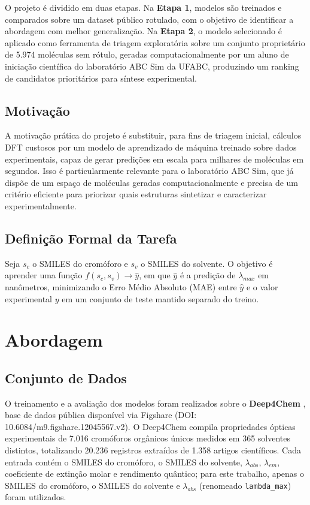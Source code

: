 \documentclass[12pt]{article}
\begin{document}
O projeto é dividido em duas etapas. Na \textbf{Etapa 1}, modelos são treinados e
comparados sobre um dataset público rotulado, com o objetivo de identificar a abordagem
com melhor generalização. Na \textbf{Etapa 2}, o modelo selecionado é aplicado como
ferramenta de triagem exploratória sobre um conjunto proprietário de 5.974 moléculas sem
rótulo, geradas computacionalmente por um aluno de iniciação científica do laboratório
ABC Sim da UFABC, produzindo um ranking de candidatos prioritários para síntese
experimental.

\subsection{Motivação}

A motivação prática do projeto é substituir, para fins de triagem inicial, cálculos DFT
custosos por um modelo de aprendizado de máquina treinado sobre dados experimentais, capaz
de gerar predições em escala para milhares de moléculas em segundos. Isso é particularmente
relevante para o laboratório ABC Sim, que já dispõe de um espaço de moléculas geradas
computacionalmente e precisa de um critério eficiente para priorizar quais estruturas
sintetizar e caracterizar experimentalmente.

\subsection{Definição Formal da Tarefa}

Seja $s_c$ o SMILES do cromóforo e $s_v$ o SMILES do solvente. O objetivo é aprender uma
função $f(s_c, s_v) \rightarrow \hat{y}$, em que $\hat{y}$ é a predição de $\lambda_{max}$
em nanômetros, minimizando o Erro Médio Absoluto (MAE) entre $\hat{y}$ e o valor
experimental $y$ em um conjunto de teste mantido separado do treino.


\section{Abordagem}
\label{sec:abordagem}

\subsection{Conjunto de Dados}

O treinamento e a avaliação dos modelos foram realizados sobre o \textbf{Deep4Chem}
\cite{joung2020}, base de dados pública disponível via Figshare (DOI:
10.6084/m9.figshare.12045567.v2). O Deep4Chem compila propriedades ópticas experimentais
de 7.016 cromóforos orgânicos únicos medidos em 365 solventes distintos, totalizando
20.236 registros extraídos de 1.358 artigos científicos. Cada entrada contém o SMILES do
cromóforo, o SMILES do solvente, $\lambda_{abs}$, $\lambda_{em}$, coeficiente de extinção
molar e rendimento quântico; para este trabalho, apenas o SMILES do cromóforo, o SMILES do
solvente e $\lambda_{abs}$ (renomeado \texttt{lambda\_max}) foram utilizados.
\end{document}
